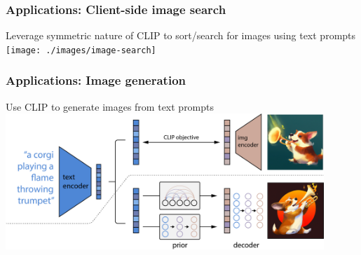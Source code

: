 \begin{frame}
    \frametitle{Applications: Client-side image search}
    Leverage symmetric nature of CLIP to sort/search for images using text prompts 
    \texttt{[image: ./images/image-search]}
\end{frame}

\begin{frame}
    \frametitle{Applications: Image generation}
    Use CLIP to generate images from text prompts 
    \includegraphics[width=12cm]{./images/unclip-figurehead}
\end{frame}
